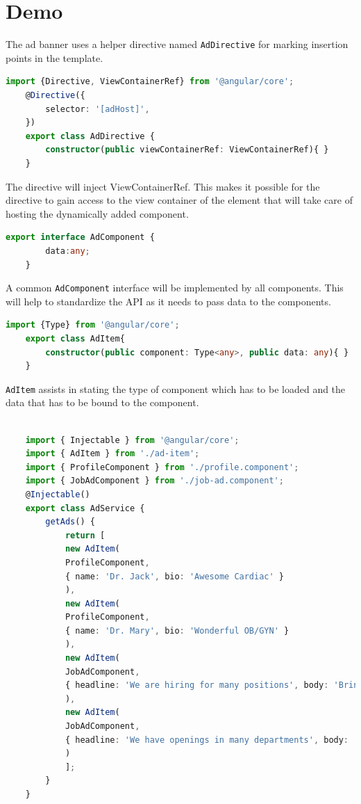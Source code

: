 \documentclass{report}
\begin{document}
\section{Demo}
The ad banner uses a helper directive named \lstinline{AdDirective} for marking insertion points in the template.

\begin{lstlisting}[caption=ad.directive.ts, language=Typescript]
	import {Directive, ViewContainerRef} from '@angular/core';
	@Directive({
		selector: '[adHost]', 
	})
	export class AdDirective {
		constructor(public viewContainerRef: ViewContainerRef){ }
	}
\end{lstlisting}

The directive will inject ViewContainerRef. This makes it possible for the directive to gain access to the view container of the element that will take care of hosting the dynamically added component.

\begin{lstlisting}[caption=ad.ts, language=Typescript]
	export interface AdComponent {
		data:any;
	}
\end{lstlisting}

A common \lstinline{AdComponent} interface will be implemented by all components. This will help to standardize the API as it needs to pass data to the components. 

\begin{lstlisting}[caption=ad-item.ts, language=Typescript]
	import {Type} from '@angular/core';
	export class AdItem{
		constructor(public component: Type<any>, public data: any){ }
	}
\end{lstlisting}

\lstinline{AdItem} assists in stating the type of component which has to be loaded and the data that has to be bound to the component.

\begin{lstlisting}[caption=ad.service.ts, language=Typescript]

	import { Injectable } from '@angular/core';
	import { AdItem } from './ad-item';
	import { ProfileComponent } from './profile.component';
	import { JobAdComponent } from './job-ad.component';
	@Injectable()
	export class AdService {
		getAds() {
			return [
			new AdItem(
			ProfileComponent,
			{ name: 'Dr. Jack', bio: 'Awesome Cardiac' }
			),
			new AdItem(
			ProfileComponent,
			{ name: 'Dr. Mary', bio: 'Wonderful OB/GYN' }
			),
			new AdItem(
			JobAdComponent,
			{ headline: 'We are hiring for many positions', body: 'Bring in your resume today!' }
			),
			new AdItem(
			JobAdComponent,
			{ headline: 'We have openings in many departments', body: 'Apply today to make the best use of opportunities!' }
			)
			];
		}
	}

\end{lstlisting}
\end{document}
